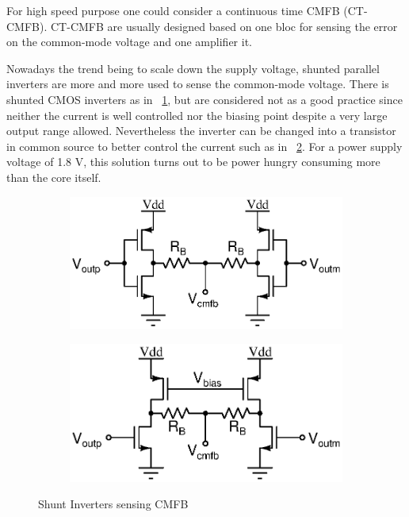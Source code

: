 For high speed purpose one could consider a continuous time CMFB (CT-CMFB). CT-CMFB are usually designed based on one bloc for sensing the error on the common-mode voltage and one amplifier it.

Nowadays the trend being to scale down the supply voltage, shunted parallel inverters are more and more used to sense the common-mode voltage. There is shunted CMOS inverters as in \figurename~\ref{fig:shunt_cmos_cmfb}, but are considered not as a good practice since neither the current is well controlled nor the biasing point despite a very large output range allowed. Nevertheless the inverter can be changed into a transistor in common source to better control the current such as in \figurename~\ref{fig:shunt_inverter_cmfb}\cite{Carillo2007,Carillo2010,Centurelli2017}. For a power supply voltage of 1.8 V, this solution turns out to be power hungry consuming more than the core itself.

\begin{figure}[htp]
    \centering
    \begin{subfigure}[b]{0.48\textwidth}
        \includegraphics[width=\textwidth]{Chapter7/Figs/shunt_cmos_cmfb.ps}
        \label{fig:shunt_cmos_cmfb}
    \end{subfigure}
    \begin{subfigure}[b]{0.48\textwidth}
        \includegraphics[width=\textwidth]{Chapter7/Figs/shunt_inverter_cmfb.ps}
        \label{fig:shunt_inverter_cmfb}
    \end{subfigure}
    \caption{Shunt Inverters sensing CMFB}
    \label{fig:shunt_inverter_sensing}
\end{figure}


